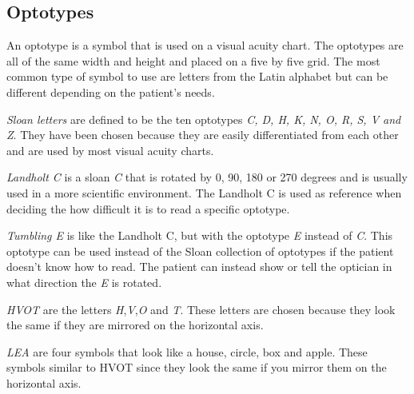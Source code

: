 \documentclass[12pt,a4paper,notitlepage]{report}
\begin{document}
\subsection{Optotypes} \label{Optotypes}
An optotype is a symbol that is used on a visual acuity chart. The optotypes are all of the same width and height and placed on a five by five grid. The most common type of symbol to use are letters from the Latin alphabet but can be different depending on the patient's needs\cite{Colenbrander}.

\textit{Sloan letters} are defined to be the ten optotypes \textit{C, D, H, K, N, O, R, S, V and Z}. They have been chosen because they are easily differentiated from each other \cite{Ferris} and are used by most visual acuity charts\cite{Colenbrander}.

\textit{Landholt C} is a sloan \textit{C} that is rotated by 0, 90, 180 or 270 degrees and is usually used in a more scientific environment. The Landholt C is used as reference when deciding the how difficult it is to read a specific optotype\cite{Colenbrander}.

\textit{Tumbling E} is like the Landholt C, but with the optotype \textit{E} instead of \textit{C}. This optotype can be used instead of the Sloan collection of optotypes if the patient doesn't know how to read. The patient can instead show or tell the optician in what direction the \textit{E} is rotated\cite{Colenbrander}.

\textit{HVOT} are the letters \textit{H},\textit{V},\textit{O} and \textit{T}. These letters are chosen because they look the same if they are mirrored on the horizontal axis.

\textit{LEA} are four symbols that look like a house, circle, box and apple. These symbols similar to HVOT since they look the same if you mirror them on the horizontal axis.
\end{document}
